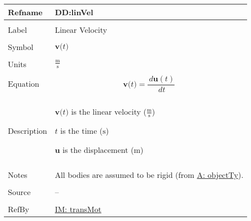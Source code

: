 \documentclass[12pt]{article}
\begin{document}
\vspace{\baselineskip}
\noindent
\begin{minipage}{\textwidth}
\begin{tabular}{>{\raggedright}p{}>{\raggedright\arraybackslash}p{}}
\toprule \textbf{Refname} & \textbf{DD:linVel}
\label{DD:linVel}
\\ \midrule \\
Label & Linear Velocity
        
\\ \midrule \\
Symbol & $\mathbf{v}\text{(}t\text{)}$
         
\\ \midrule \\
Units & $\frac{\text{m}}{\text{s}}$
        
\\ \midrule \\
Equation & \begin{displaymath}
           \mathbf{v}\text{(}t\text{)}=\frac{\,d\mathbf{u}\left(t\right)}{\,dt}
           \end{displaymath}
\\ \midrule \\
Description & \begin{symbDescription}
              \item{$\mathbf{v}\text{(}t\text{)}$ is the linear velocity ($\frac{\text{m}}{\text{s}}$)}
              \item{$t$ is the time (${\text{s}}$)}
              \item{$\mathbf{u}$ is the displacement (${\text{m}}$)}
              \end{symbDescription}
\\ \midrule \\
Notes & All bodies are assumed to be rigid (from \hyperref[assumpOT]{A: objectTy}).
        
\\ \midrule \\
Source & --
         
\\ \midrule \\
RefBy & \hyperref[IM:transMot]{IM: transMot}
        
\\ \bottomrule
\end{tabular}
\end{minipage}
\end{document}
